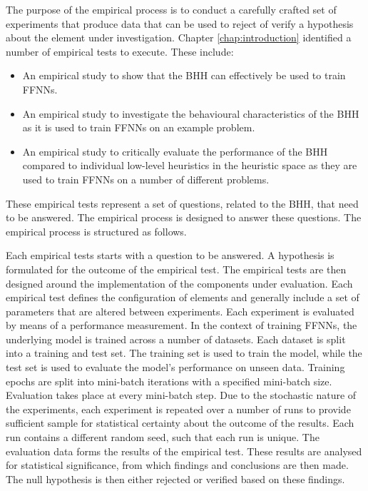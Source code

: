 The purpose of the empirical process is to conduct a carefully crafted set of experiments that produce data that can be used to reject of verify a hypothesis about the element under investigation. Chapter \ref{chap:introduction} identified a number of empirical tests to execute. These include:

\begin{itemize}
      \item An empirical study to show that the \Acs{BHH} can effectively be used to train \acp{FFNN}.

      \item An empirical study to investigate the behavioural characteristics of the \Acs{BHH} as it is used to train \acp{FFNN} on an example problem.

      \item An empirical study to critically evaluate the performance of the \Acs{BHH} compared to individual low-level heuristics in the heuristic space as they are used to train \acp{FFNN} on a number of different problems.
\end{itemize}

These empirical tests represent a set of questions, related to the \acs{BHH}, that need to be answered. The empirical process is designed to answer these questions. The empirical process is structured as follows.

Each empirical tests starts with a question to be answered. A hypothesis is formulated for the outcome of the empirical test. The empirical tests are then designed around the implementation of the components under evaluation. Each empirical test defines the configuration of elements and generally include a set of parameters that are altered between experiments. Each experiment is evaluated by means of a performance measurement. In the context of training \acp{FFNN}, the underlying model is trained across a number of datasets. Each dataset is split into a training and test set. The training set is used to train the model, while the test set is used to evaluate the model's performance on unseen data. Training epochs are split into mini-batch iterations with a specified mini-batch size. Evaluation takes place at every mini-batch step. Due to the stochastic nature of the experiments, each experiment is repeated over a number of runs to provide sufficient sample for statistical certainty about the outcome of the results. Each run contains a different random seed, such that each run is unique. The evaluation data forms the results of the empirical test. These results are analysed for statistical significance, from which findings and conclusions are then made. The null hypothesis is then either rejected or verified based on these findings.

